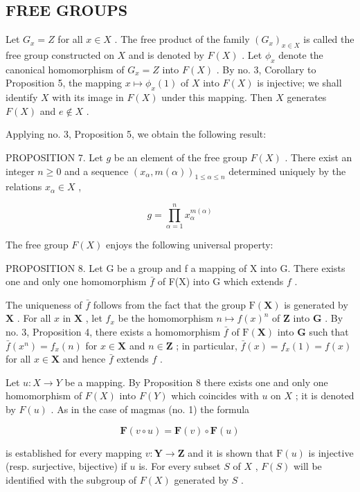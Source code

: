 \subsection{FREE GROUPS}

Let \(G_x = Z\) for all \(x \in X\) . The free product of the family \((G_x)_{x \in X}\) is called the free group constructed on \(X\) and is denoted by \(F(X)\) . Let \(\phi_x\) denote the canonical homomorphism of \(G_x = Z\) into \(F(X)\) . By no. 3, Corollary to Proposition 5, the mapping \(x \mapsto \phi_x(1)\) of \(X\) into \(F(X)\) is injective; we shall identify \(X\) with its image in \(F(X)\) under this mapping. Then \(X\) generates \(F(X)\) and \(e \notin X\) .

Applying no. 3, Proposition 5, we obtain the following result:

PROPOSITION 7. Let \(g\) be an element of the free group \(F(X)\) . There exist an integer \(n \geqslant 0\) and a sequence \((x_{\alpha}, m(\alpha))_{1 \leqslant \alpha \leqslant n}\) determined uniquely by the relations \(x_{\alpha} \in X\) ,

\[
g = \prod_ {\alpha = 1} ^ {n} x _ {\alpha} ^ {m (\alpha)}
\]

The free group \(F(X)\) enjoys the following universal property:

PROPOSITION 8. Let G be a group and f a mapping of X into G. There exists one and only one homomorphism \(\bar{f}\) of F(X) into G which extends \(f\) .

The uniqueness of \(\bar{f}\) follows from the fact that the group \(\mathrm{F}(\mathbf{X})\) is generated by \(\mathbf{X}\) . For all \(x\) in \(\mathbf{X}\) , let \(f_x\) be the homomorphism \(n \mapsto f(x)^n\) of \(\mathbf{Z}\) into \(\mathbf{G}\) . By no. 3, Proposition 4, there exists a homomorphism \(\bar{f}\) of \(\mathrm{F}(\mathbf{X})\) into \(\mathbf{G}\) such that \(\bar{f}(x^n) = f_x(n)\) for \(x \in \mathbf{X}\) and \(n \in \mathbf{Z}\) ; in particular, \(\bar{f}(x) = f_x(1) = f(x)\) for all \(x \in \mathbf{X}\) and hence \(\bar{f}\) extends \(f\) .

Let \(u: X \to Y\) be a mapping. By Proposition 8 there exists one and only one homomorphism of \(F(X)\) into \(F(Y)\) which coincides with \(u\) on \(X\) ; it is denoted by \(F(u)\) . As in the case of magmas (no. 1) the formula

\[
\mathbf {F} (v \circ u) = \mathbf {F} (v) \circ \mathbf {F} (u)
\]

is established for every mapping \(v: \mathbf{Y} \to \mathbf{Z}\) and it is shown that \(\mathrm{F}(u)\) is injective (resp. surjective, bijective) if \(u\) is. For every subset \(S\) of \(X\) , \(F(S)\) will be identified with the subgroup of \(F(X)\) generated by \(S\) .

